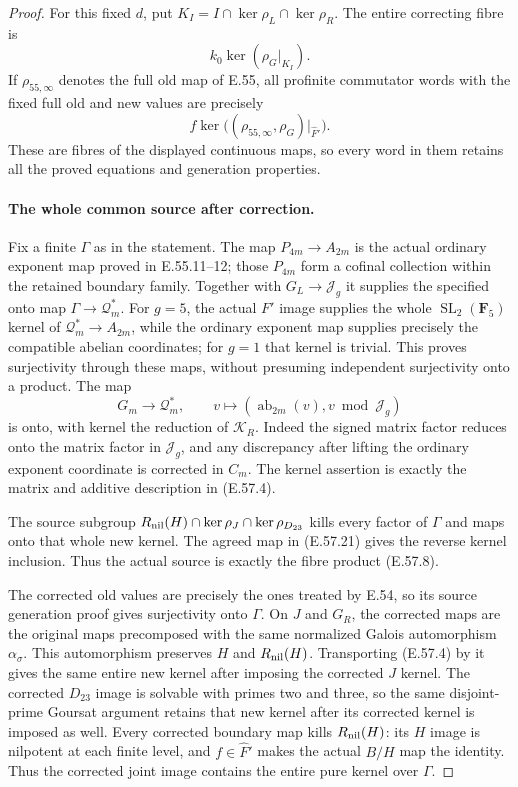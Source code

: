 \begin{proof}
For this fixed $d$, put
$K_I=I\cap\ker\rho_L\cap\ker\rho_R$.
The entire correcting fibre is
\[
                         k_0\ker(\rho_G|_{K_I}).
 \tag{E.57.19}
\]
If $\rho_{55,\infty}$ denotes the full old map
of E.55, all profinite commutator words with
the fixed full old and new values are precisely
\[
             f\ker\bigl((\rho_{55,\infty},\rho_G)|_{\widehat F'}\bigr).
 \tag{E.57.20}
\]
These are fibres of the displayed continuous
maps, so every word in them retains all the
proved equations and generation properties.

\paragraph{The whole common source after correction.}
Fix a finite $\Gamma$ as in the statement.
The map $P_{4m}\to A_{2m}$ is the actual
ordinary exponent map proved in E.55.11--12;
those $P_{4m}$ form a cofinal collection within
the retained boundary family.
Together with $G_L\to\mathcal J_g$ it supplies
the specified onto map
$\Gamma\to\mathcal Q_m^{\!*}$.
For $g=5$, the actual $F'$ image supplies the
whole $\operatorname{SL}_2(\mathbf F_5)$ kernel
of $\mathcal Q_m^{\!*}\to A_{2m}$, while the
ordinary exponent map supplies precisely the
compatible abelian coordinates; for $g=1$ that
kernel is trivial.  This proves surjectivity
through these maps, without presuming independent
surjectivity onto a product.
The map
\[
 G_m\longrightarrow\mathcal Q_m^{\!*},
       \qquad v\longmapsto
          (\operatorname{ab}_{2m}(v),v\bmod\mathcal J_g)
 \tag{E.57.21}
\]
is onto, with kernel the reduction of
$\mathcal K_R$.  Indeed the signed matrix
factor reduces onto the matrix factor in
$\mathcal J_g$, and any discrepancy after
lifting the ordinary exponent coordinate is
corrected in $C_m$.  The kernel assertion is
exactly the matrix and additive description
in \textup{(E.57.4)}.

The source subgroup
$R_{\rm nil}(H)\cap\ker\rho_J\cap\ker\rho_{D_{23}}$
kills every factor of $\Gamma$ and maps onto
that whole new kernel.  The agreed map in
\textup{(E.57.21)} gives the reverse kernel
inclusion.  Thus the actual source is exactly
the fibre product \textup{(E.57.8)}.

The corrected old values are precisely the
ones treated by E.54, so its source generation
proof gives surjectivity onto $\Gamma$.
On $J$ and $G_R$, the corrected maps are the
original maps precomposed with the same
normalized Galois automorphism $\alpha_\sigma$.
This automorphism preserves $H$ and
$R_{\rm nil}(H)$.  Transporting
\textup{(E.57.4)} by it gives the same entire
new kernel after imposing the corrected $J$
kernel.  The corrected $D_{23}$ image is
solvable with primes two and three, so the
same disjoint-prime Goursat argument retains
that new kernel after its corrected kernel
is imposed as well.
Every corrected boundary map kills
$R_{\rm nil}(H)$: its $H$ image is nilpotent
at each finite level, and $f\in\widehat F'$
makes the actual $B/H$ map the identity.
Thus the corrected joint image contains
the entire pure kernel over $\Gamma$.


\end{proof}
